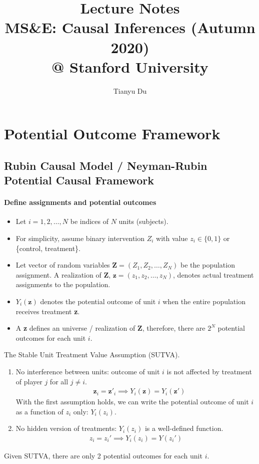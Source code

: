 \documentclass[11pt]{article}
\title{Lecture Notes \\ MS\&E: Causal Inferences (Autumn 2020) \\ @ Stanford University}
\author{Tianyu Du}
\begin{document}
	\maketitle
	\section{Potential Outcome Framework}
	\subsection{Rubin Causal Model / Neyman-Rubin Potential Causal Framework}
	\paragraph{Define assignments and potential outcomes}
	\begin{itemize}
		\item Let $i = 1, 2, \dots, N$ be indices of $N$ units (subjects).
		\item For simplicity, assume binary intervention $Z_i$ with value $z_i \in \{0, 1\}$ or \{control, treatment\}.
		\item Let vector of random variables $\textbf{Z} = (Z_1, Z_2, \dots, Z_N)$ be the population assignment. A realization of \textbf{Z}, $\textbf{z} = (z_1, z_2, \dots, z_N)$, denotes actual treatment assignments to the population.
		\item $Y_i(\textbf{z})$ denotes the potential outcome of unit $i$ when the entire population receives treatment \textbf{z}.
		\item A \textbf{z} defines an universe / realization of \textbf{Z}, therefore, there are $2^N$ potential outcomes for each unit $i$.
	\end{itemize}

	\begin{assumption}
		The Stable Unit Treatment Value Assumption (SUTVA).
		\begin{enumerate}
			\item No interference between units: outcome of unit $i$ is not affected by treatment of player $j$ for all $j \neq i$.
			\begin{align}
				\quad \textbf{z}_i = \textbf{z}'_i \implies Y_i(\textbf{z}) = Y_i(\textbf{z}')
			\end{align}
			With the first assumption holds, we can write the potential outcome of unit $i$ as a function of $z_i$ only: $Y_i(z_i)$.
			\item No hidden version of treatments: $Y_i(z_i)$ is a well-defined function.
			\begin{align}
				z_i = z_i' \implies Y_i(z_i) = Y(z_i')
			\end{align}
		\end{enumerate}
	\end{assumption}
	Given SUTVA, there are only 2 potential outcomes for each unit $i$.
\end{document}
